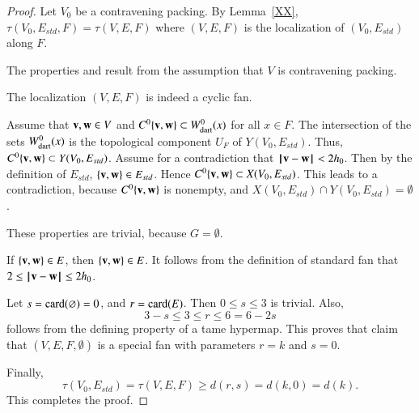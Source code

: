 \begin{proof}
Let $V_0$ be a contravening packing.
By Lemma~\ref{XX}, $\tau(V_0,E_{std},F)=\tau(V,E,F)$  where $(V,E,F)$ is the
localization of
$(V_0,E_{std})$ along $F$. 

  The properties  and
 result from the assumption that $V$ is contravening
packing.  

  The localization $(V,E,F)$ is indeed a cyclic fan.

  Assume that ${\mathbf v},{\mathbf w}\in V$ and 
$C^0\{{\mathbf v},{\mathbf w}\}\subset W^0_{\text{dart}}(x)$ for all $x\in F$.
The intersection of the sets $W^0_{\text{dart}}(x)$ is the topological component
$U_F$ of $Y(V_0,E_{std})$.  Thus, $C^0\{{\mathbf v},{\mathbf w}\}\subset Y(V_0,E_{std})$.
Assume for a contradiction that ${\hskip0.1em|\hskip-0.15em|\hskip0.1em}{\mathbf v} - {\mathbf w}{\hskip0.1em|\hskip-0.15em|\hskip0.1em}< 2{h_0}$. Then by the definition of $E_{std}$, $\{{\mathbf v},{\mathbf w}\}\in E_{std}$.
Hence $C^0\{{\mathbf v},{\mathbf w}\}\subset X(V_0,E_{std})$. This leads to a contradiction, because
$C^0\{{\mathbf v},{\mathbf w}\}$ is nonempty, and $X(V_0,E_{std})\cap Y(V_0,E_{std})=\emptyset$.

   These properties are trivial, because $G=\emptyset$.

 If $\{{\mathbf v},{\mathbf w}\}\in E$, then $\{{\mathbf v},{\mathbf w}\}\in E$.  It follows from the definition of
standard fan that $2\le {\hskip0.1em|\hskip-0.15em|\hskip0.1em}{\mathbf v} - {\mathbf w}{\hskip0.1em|\hskip-0.15em|\hskip0.1em}\le 2{h_0}$.

 Let $s={\operatorname{card}}(\varnothing) = 0$, and $r={\operatorname{card}}(E)$.  Then $0\le s\le 3$ is trivial. Also, 
$$3-s \le 3\le r \le 6=6 - 2s$$
follows from the defining property  of a tame hypermap.  This proves that claim that
$(V,E,F,\emptyset)$ is a special fan with parameters $r=k$ and $s=0$.

Finally, 
$$\tau(V_0,E_{std})=\tau(V,E,F) \ge d(r,s) = d(k,0) = d(k).$$  
This completes the proof.
\end{proof}


